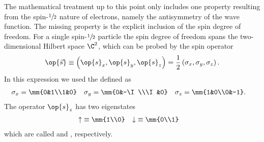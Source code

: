 \begin{rem}
	\label{rem:Spin}
	The mathematical treatment up to this point
	only includes one property resulting from the spin-$\sfrac12$ nature
	of electrons,
	namely the antisymmetry of the wave function.
	The missing property is the explicit inclusion of the spin degree of freedom.
	For a single spin-$\sfrac12$ particle the spin degree of freedom
	spans the two-dimensional Hilbert space $\C^2$,
	which can be probed by the spin operator
	\[ \op{\vec{s}} \equiv \left( \op{s}_x, \op{s}_y, \op{s}_z \right)
		= \frac12 \left( \sigma_x, \sigma_y, \sigma_z \right). \]
	In this expression we used the  defined as
	\begin{align}
		\label{eqn:PauliMatrices}
		\sigma_x &= \mm{0&1\\1&0} &
		\sigma_y &= \mm{0&-\I\\\I&0} &
		\sigma_z &= \mm{1&0\\0&-1}.
	\end{align}
	The operator $\op{s}_z$ has two eigenstates
	\begin{align*}
		\uparrow &\equiv \mm{1\\0} & \downarrow &\equiv \mm{0\\1}
	\end{align*}
	which are called  and , respectively.


\end{rem}

